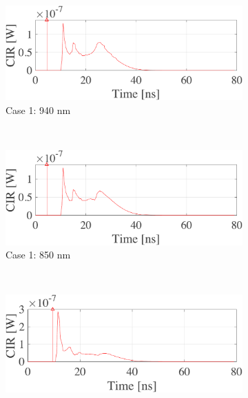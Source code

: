          \begin{figure}[h]
            \centering
            \begin{subfigure}[b]{0.49\columnwidth}
                \centering
                \includegraphics[width=1\columnwidth,draft=false]{./ch_background/figs/case1_ul_n.pdf}
                \caption{Case 1: 940 nm}
            \end{subfigure}~
            \begin{subfigure}[b]{0.49\columnwidth}
                \centering
                \includegraphics[width=1\columnwidth,draft=false]{./ch_background/figs/case1_ul.pdf}
                \caption{Case 1: 850 nm}
            \end{subfigure}\\
            \begin{subfigure}[b]{0.49\columnwidth}
                \centering
                \includegraphics[width=1\columnwidth,draft=false]{./ch_background/figs/case2_ul_n.pdf}

\end{subfigure}
\end{figure}
